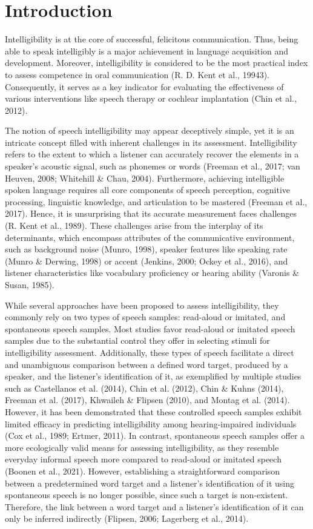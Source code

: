 \documentclass[
]{agujournal2019}
\begin{document}
\section{Introduction}\label{sec-introduction}

Intelligibility is at the core of successful, felicitous communication.
Thus, being able to speak intelligibly is a major achievement in
language acquisition and development. Moreover, intelligibility is
considered to be the most practical index to assess competence in oral
communication (R. D. Kent et al., 19943). Consequently, it serves as a
key indicator for evaluating the effectiveness of various interventions
like speech therapy or cochlear implantation (Chin et al., 2012).

The notion of speech intelligibility may appear deceptively simple, yet
it is an intricate concept filled with inherent challenges in its
assessment. Intelligibility refers to the extent to which a listener can
accurately recover the elements in a speaker's acoustic signal, such as
phonemes or words (Freeman et al., 2017; van Heuven, 2008; Whitehill \&
Chau, 2004). Furthermore, achieving intelligible spoken language
requires all core components of speech perception, cognitive processing,
linguistic knowledge, and articulation to be mastered (Freeman et al.,
2017). Hence, it is unsurprising that its accurate measurement faces
challenges (R. Kent et al., 1989). These challenges arise from the
interplay of its determinants, which encompass attributes of the
communicative environment, such as background noise (Munro, 1998),
speaker features like speaking rate (Munro \& Derwing, 1998) or accent
(Jenkins, 2000; Ockey et al., 2016), and listener characteristics like
vocabulary proficiency or hearing ability (Varonis \& Susan, 1985).

While several approaches have been proposed to assess intelligibility,
they commonly rely on two types of speech samples: read-aloud or
imitated, and spontaneous speech samples. Most studies favor read-aloud
or imitated speech samples due to the substantial control they offer in
selecting stimuli for intelligibility assessment. Additionally, these
types of speech facilitate a direct and unambiguous comparison between a
defined word target, produced by a speaker, and the listener's
identification of it, as exemplified by multiple studies such as
Castellanos et al. (2014), Chin et al. (2012), Chin \& Kuhns (2014),
Freeman et al. (2017), Khwaileh \& Flipsen (2010), and Montag et al.
(2014). However, it has been demonstrated that these controlled speech
samples exhibit limited efficacy in predicting intelligibility among
hearing-impaired individuals (Cox et al., 1989; Ertmer, 2011). In
contrast, spontaneous speech samples offer a more ecologically valid
means for assessing intelligibility, as they resemble everyday informal
speech more compared to read-aloud or imitated speech (Boonen et al.,
2021). However, establishing a straightforward comparison between a
predetermined word target and a listener's identification of it using
spontaneous speech is no longer possible, since such a target is
non-existent. Therefore, the link between a word target and a listener's
identification of it can only be inferred indirectly (Flipsen, 2006;
Lagerberg et al., 2014).
\end{document}
